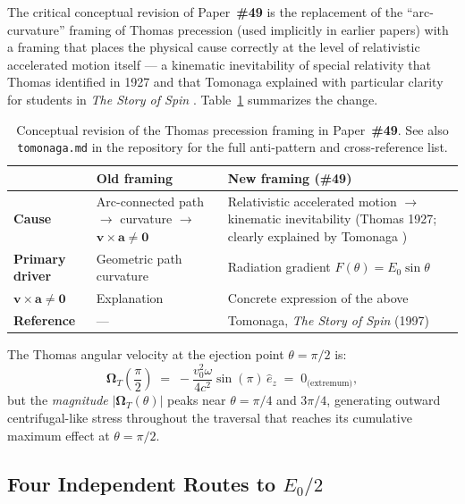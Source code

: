 \documentclass[12pt,letterpaper]{article}
\newcommand{\paperno}[1]{\textbf{\#{}#1}}
\newcommand{\OmT}{\boldsymbol{\Omega}_T}
\begin{document}
The critical conceptual revision of Paper~\paperno{49} is the replacement of the
``arc-curvature'' framing of Thomas precession (used implicitly in earlier papers)
with a framing that places the physical cause correctly at the level of relativistic
accelerated motion itself --- a kinematic inevitability of special relativity that
Thomas identified in 1927 and that Tomonaga explained with particular clarity
for students in \textit{The Story of Spin} \cite{Tomonaga1997}.
Table~\ref{tab:framing} summarizes the change.

\begin{table}[h!]
\centering
\renewcommand{\arraystretch}{1.4}
\begin{tabular}{p{3.5cm}p{5.0cm}p{5.0cm}}
\toprule
 & \textbf{Old framing} & \textbf{New framing (\#49)} \\
\midrule
\textbf{Cause} & Arc-connected path $\to$ curvature $\to$ $\mathbf{v}\times\mathbf{a}\neq\mathbf{0}$ &
  Relativistic accelerated motion $\to$ kinematic inevitability (Thomas 1927; clearly explained by Tomonaga \cite{Tomonaga1997}) \\
\addlinespace[0.2cm]
\textbf{Primary driver} & Geometric path curvature &
  Radiation gradient $F(\theta)=E_0\sin\theta$ \\
\addlinespace[0.2cm]
\textbf{$\mathbf{v}\times\mathbf{a}\neq\mathbf{0}$} & Explanation &
  Concrete expression of the above \\
\addlinespace[0.2cm]
\textbf{Reference} & --- &
  Tomonaga, \textit{The Story of Spin} (1997) \cite{Tomonaga1997} \\
\bottomrule
\end{tabular}
\caption{Conceptual revision of the Thomas precession framing in Paper~\paperno{49}.
See also \texttt{tomonaga.md} in the repository for the full anti-pattern and cross-reference list.}
\label{tab:framing}
\end{table}

\noindent The Thomas angular velocity at the ejection point $\theta=\pi/2$ is:
\begin{equation}
\OmT\!\left(\frac{\pi}{2}\right)
\;=\; -\frac{v_0^2\omega}{4c^2}\sin(\pi)\,\hat{e}_z \;=\; 0_{\text{(extremum)}},
\end{equation}
but the \emph{magnitude} $|\OmT(\theta)|$ peaks near $\theta=\pi/4$ and $3\pi/4$,
generating outward centrifugal-like stress throughout the traversal that reaches its
cumulative maximum effect at $\theta=\pi/2$.

\subsection{\texorpdfstring{Four Independent Routes to $E_0/2$}{Four Independent Routes to E_0/2}}
\end{document}
